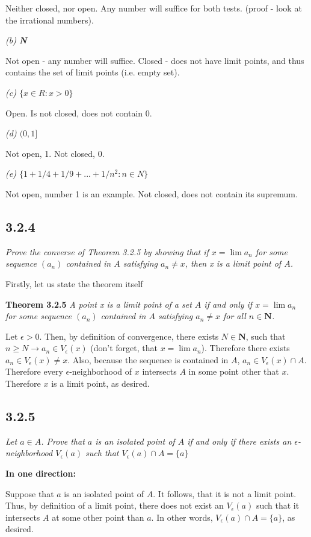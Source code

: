 \documentclass[11pt,oneside,titlepage]{book}
\begin{document}
Neither closed, nor open. Any number will suffice for both tests.
(proof - look at the irrational numbers).

\textit{(b) \textbf{N}}

Not open - any number will suffice. Closed - does not have limit points, and
thus contains the set of limit points (i.e. empty set).

\textit{(c) $\{x \in R: x > 0\}$}

Open. Is not closed, does not contain 0.

\textit{(d) $(0,1]$}

Not open, 1. Not closed, 0.

\textit{(e) $\{1 + 1/4 + 1/9 + ... + 1/n^2: n \in N\}$}

Not open, number 1 is an example. Not closed, does not contain its supremum.


\subsection*{3.2.4}
\textit{Prove the converse of Theorem 3.2.5 by showing that if
  $x = \lim a_n$ for some sequence $(a_n)$ contained in $A$ satisfying
  $a_n \neq x$, then x is a limit point of $A$.}

Firstly, let us state the theorem itself

\textbf{Theorem 3.2.5}
\textit{A point x is a limit point of a set $A$ if and only if $x = \lim a_n$
  for some sequence $(a_n)$ contained in $A$ satisfying $a_n \neq x$ for all
  $n \in \textbf{N}$.}

Let  $\epsilon > 0$. Then, by definition of convergence, there
exists $N \in \textbf{N}$, such that $n \geq N \to a_n \in V_\epsilon(x)$
(don't forget, that $x = \lim a_n$). Therefore there exists
$a_n \in V_\epsilon(x) \neq x $. Also, because the sequence is contained in
$A$, $a_n \in V_\epsilon(x) \cap A$.  Therefore every $\epsilon$-neighborhood
of $x$ intersects  $A$ in some point other that $x$. Therefore $x$ is a limit
point, as desired.

\subsection*{3.2.5}
\textit{Let $a \in A$. Prove that $a$ is an isolated point of $A$ if and only
  if there exists an $\epsilon$-neighborhood $V_\epsilon(a)$ such that
  $V_\epsilon(a) \cap A = \{a\}$ }

\textbf{In one direction:}

Suppose that $a$ is an isolated point of $A$. It follows, that it is not a
limit point. Thus, by definition of a limit point, there does not exist an
$V_\epsilon(a)$ such that it intersects $A$ at some other point than $a$.
In other words, $V_\epsilon(a) \cap A = \{a\}$, as desired.
\end{document}
